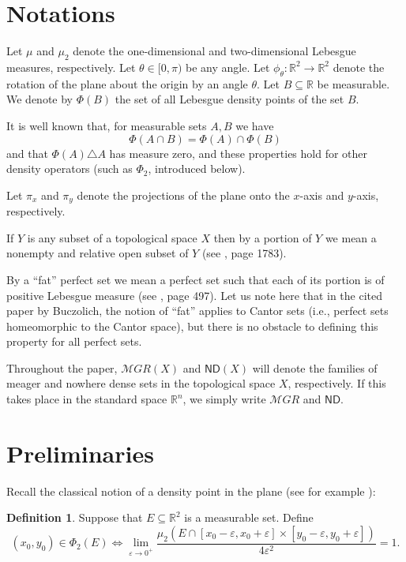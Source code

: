 \documentclass[12pt]{amsart}
\theoremstyle{plain}
\theoremstyle{definition}
\newtheorem{definition}[theorem]{Definition}
\theoremstyle{remark}
\newcommand{\meager}{{\mathcal MGR}}
\newcommand{\ND}{\mathsf{ND}}
\newcommand{\real}{\mathbb{R}}
\begin{document}
\section{Notations}
Let $\mu$ and $\mu_2$ denote the one-dimensional
and two-dimensional Lebesgue measures, respectively.
Let $\theta \in [0, \pi)$ be any angle.
Let $\phi_\theta \colon \real^2\to\real^2$ denote
the rotation of the plane about the origin by an angle $\theta$.
Let $B\subseteq\real$ be measurable.
We denote by $\Phi(B)$ the set of all Lebesgue density points of the set $B$.

It is well known that, for measurable sets $A, B$ we have
\[
\Phi(A \cap B) = \Phi(A) \cap \Phi(B)
\]
and that $\Phi(A) \triangle A$ has measure zero, and
these properties hold for other density operators
(such as $\Phi_2$, introduced below).

Let $\pi_x$ and $\pi_y$ denote the projections of the plane
onto the $x$-axis and $y$-axis, respectively.

If $Y$ is any subset of a topological space $X$ then by a portion of
$Y$ we mean a nonempty and relative open subset of $Y$
(see \cite{Laczkovich1998}, page 1783).

By a ``fat'' perfect set we mean a perfect set such that each of
its portion is of positive Lebesgue measure (see \cite{Buczolich2004}, page 497).
Let us note here that in the cited paper by Buczolich,
the notion of ``fat'' applies to Cantor sets
(i.e., perfect sets homeomorphic to the Cantor space),
but there is no obstacle to defining this property for all perfect sets.

Throughout the paper, $\meager(X)$ and $\ND(X)$ will denote the families
of meager and nowhere dense sets in the topological space $X$, respectively.
If this takes place in the standard space $\real^n$, we simply write
$\meager$ and $\ND$.

\section{Preliminaries}

Recall the classical notion of a density point in the plane
(see for example \cite{WagnerBojakowska19921993}):

\begin{definition}
Suppose that $E \subseteq \real^2$ is a measurable set. 
Define
\[
  (x_0, y_0) \in \Phi_2(E) \iff
  \lim_{\varepsilon\to 0^+}
  \frac{\mu_2(E \cap [x_0 - \varepsilon, x_0 + \varepsilon] \times
   [y_0 - \varepsilon, y_0 + \varepsilon])}{4 \varepsilon^2} = 1.
\]
\end{definition}
\end{document}
